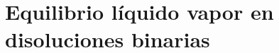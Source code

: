 \documentclass[11pt,letterpaper]{article}
\begin{document}
	
	\section{Equilibrio líquido vapor en disoluciones binarias}
	
	
\end{document}
